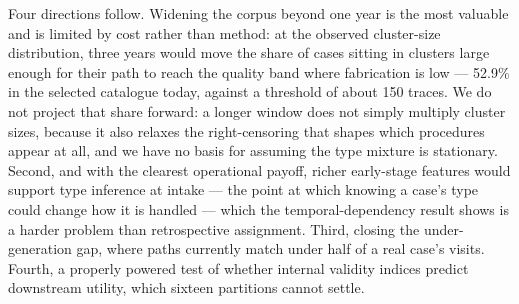 Four directions follow. Widening the corpus beyond one year is the most valuable and is limited
by cost rather than method: at the observed cluster-size distribution, three years would move
the share of cases sitting in clusters large enough for their path to reach the quality band
where fabrication is low --- 52.9\% in the selected catalogue today, against a threshold of
about 150 traces. We do not project that share forward: a longer window does not simply
multiply cluster sizes, because it also relaxes the right-censoring that shapes which
procedures appear at all, and we have no basis for assuming the type mixture is stationary.
Second, and with the clearest operational payoff, richer early-stage features would support type
inference at intake --- the point at which knowing a case's type could change how it is handled
--- which the temporal-dependency result shows is a harder problem than retrospective
assignment. Third, closing the under-generation gap, where paths currently match under half of a
real case's visits. Fourth, a properly powered test of whether internal validity indices predict
downstream utility, which sixteen partitions cannot settle.
